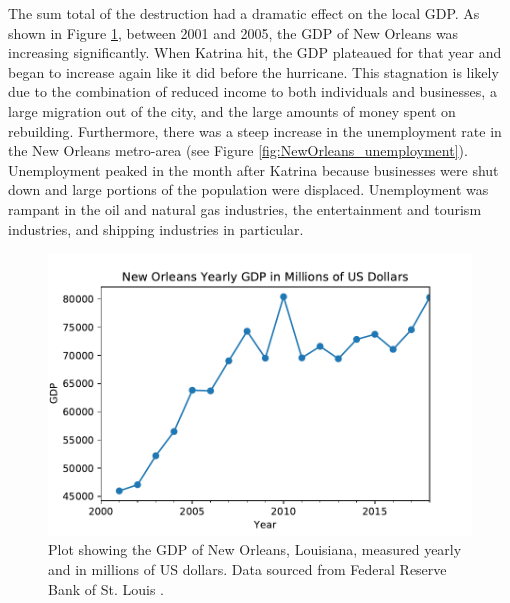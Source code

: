 \documentclass[%
 reprint,
 amsmath,amssymb,
 aps,
]{revtex4-1}
\begin{document}
The sum total of the destruction had a dramatic effect on the local GDP. As shown in Figure \ref{fig:NewOrleans_GDP}, between 2001 and 2005, the GDP of New Orleans was increasing significantly. When Katrina hit, the GDP plateaued for that year and began to increase again like it did before the hurricane. This stagnation is likely due to the combination of reduced income to both individuals and businesses, a large migration out of the city, and the large amounts of money spent on rebuilding. Furthermore, there was a steep increase in the unemployment rate in the New Orleans metro-area (see Figure \ref{fig:NewOrleans_unemployment}). Unemployment peaked in the month after Katrina because businesses were shut down and large portions of the population were displaced. Unemployment was rampant in the oil and natural gas industries, the entertainment and tourism industries, and shipping industries in particular.

\begin{figure}
	\includegraphics[scale=0.6]{plot_NewOrleans_GDP.pdf}
	\centering
	\caption{Plot showing the GDP of New Orleans, Louisiana, measured yearly and in millions of US dollars. Data sourced from Federal Reserve Bank of St. Louis \cite{NOLA_GDP_data}.}
	\label{fig:NewOrleans_GDP}
\end{figure}
\end{document}
